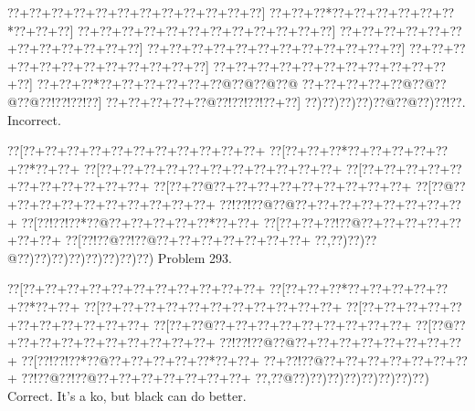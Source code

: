 \documentclass[a5paper]{article}
\begin{document}
\begin{center}
{\goo
\0??+\0??+\0??+\0??+\0??+\0??+\0??+\0??+\0??+\0??+\0??+\0??]
\0??+\0??+\0??*\0??+\0??+\0??+\0??+\0??+\0??*\0??+\0??+\0??]
\0??+\0??+\0??+\0??+\0??+\0??+\0??+\0??+\0??+\0??+\0??+\0??]
\0??+\0??+\0??+\0??+\0??+\0??+\0??+\0??+\0??+\0??+\0??+\0??]
\0??+\0??+\0??+\0??+\0??+\0??+\0??+\0??+\0??+\0??+\0??+\0??]
\0??+\0??+\0??+\0??+\0??+\0??+\0??+\0??+\0??+\0??+\0??+\0??]
\0??+\0??+\0??+\0??+\0??+\0??+\0??+\0??+\0??+\0??+\0??+\0??]
\0??+\0??+\0??*\0??+\0??+\0??+\0??+\0??+\0??@\0??@\0??@\0??@
\0??+\0??+\0??+\0??+\0??@\0??@\0??@\0??@\0??!\0??!\0??!\0??]
\0??+\0??+\0??+\0??+\0??@\0??!\0??!\0??!\0??+\0??]
\0??)\0??)\0??)\0??)\0??@\0??@\0??)\0??!\0??.
}
Incorrect. 

\end{center}
\newpage
\begin{center}
{\goo
\0??[\0??+\0??+\0??+\0??+\0??+\0??+\0??+\0??+\0??+\0??+\0??+
\0??[\0??+\0??+\0??*\0??+\0??+\0??+\0??+\0??+\0??*\0??+\0??+
\0??[\0??+\0??+\0??+\0??+\0??+\0??+\0??+\0??+\0??+\0??+\0??+
\0??[\0??+\0??+\0??+\0??+\0??+\0??+\0??+\0??+\0??+\0??+\0??+
\0??[\0??+\0??@\0??+\0??+\0??+\0??+\0??+\0??+\0??+\0??+\0??+
\0??[\0??@\0??+\0??+\0??+\0??+\0??+\0??+\0??+\0??+\0??+\0??+
\0??!\0??!\0??@\0??@\0??+\0??+\0??+\0??+\0??+\0??+\0??+\0??+
\0??[\0??!\0??!\0??*\0??@\0??+\0??+\0??+\0??+\0??*\0??+\0??+
\0??[\0??+\0??+\0??!\0??@\0??+\0??+\0??+\0??+\0??+\0??+\0??+
\0??[\0??!\0??@\0??!\0??@\0??+\0??+\0??+\0??+\0??+\0??+\0??+
\0??,\0??)\0??)\0??@\0??)\0??)\0??)\0??)\0??)\0??)\0??)\0??)
}
Problem 293.

\end{center}
\begin{center}
{\goo
\0??[\0??+\0??+\0??+\0??+\0??+\0??+\0??+\0??+\0??+\0??+\0??+
\0??[\0??+\0??+\0??*\0??+\0??+\0??+\0??+\0??+\0??*\0??+\0??+
\0??[\0??+\0??+\0??+\0??+\0??+\0??+\0??+\0??+\0??+\0??+\0??+
\0??[\0??+\0??+\0??+\0??+\0??+\0??+\0??+\0??+\0??+\0??+\0??+
\0??[\0??+\0??@\0??+\0??+\0??+\0??+\0??+\0??+\0??+\0??+\0??+
\0??[\0??@\0??+\0??+\0??+\0??+\0??+\0??+\0??+\0??+\0??+\0??+
\0??!\0??!\0??@\0??@\0??+\0??+\0??+\0??+\0??+\0??+\0??+\0??+
\0??[\0??!\0??!\0??*\0??@\0??+\0??+\0??+\0??+\0??*\0??+\0??+
\0??+\0??!\0??@\0??+\0??+\0??+\0??+\0??+\0??+\0??+
\0??!\0??@\0??!\0??@\0??+\0??+\0??+\0??+\0??+\0??+\0??+
\0??,\0??@\0??)\0??)\0??)\0??)\0??)\0??)\0??)\0??)
}
Correct. It's a ko, but black can do better.

\end{center}
\end{document}
